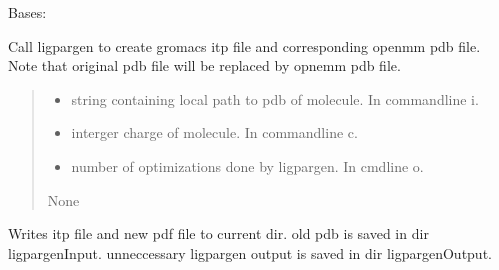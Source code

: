 \documentclass[letterpaper,10pt,english]{sphinxmanual}
\begin{document}
\begin{fulllineitems}
\label{\detokenize{protein:protein.Sugar_prep}}
\pysigstartsignatures
{}
\pysigstopsignatures
\sphinxAtStartPar
Bases: 

\begin{fulllineitems}
\label{\detokenize{protein:protein.Sugar_prep.create_itp}}
\pysigstartsignatures
{}
\pysigstopsignatures
\sphinxAtStartPar
Call ligpargen to create gromacs itp file and corresponding openmm
pdb file. Note that original pdb file will be replaced by opnemm pdb
file.
\begin{quote}\begin{description}
\begin{itemize}
\item {} 
\sphinxAtStartPar
{} \textendash{} string containing local path to pdb of molecule. In commandline \sphinxhyphen{}i.

\item {} 
\sphinxAtStartPar
{} \textendash{} interger charge of molecule. In commandline \sphinxhyphen{}c.

\item {} 
\sphinxAtStartPar
{} \textendash{} number of optimizations done by ligpargen. In cmdline \sphinxhyphen{}o.

\end{itemize}

\sphinxAtStartPar
None

\end{description}\end{quote}

\sphinxAtStartPar
Writes itp file and new pdf file to current dir. old pdb is saved in dir ligpargenInput. 
unneccessary ligpargen output is saved in dir ligpargenOutput.


\end{fulllineitems}
\end{fulllineitems}
\end{document}
